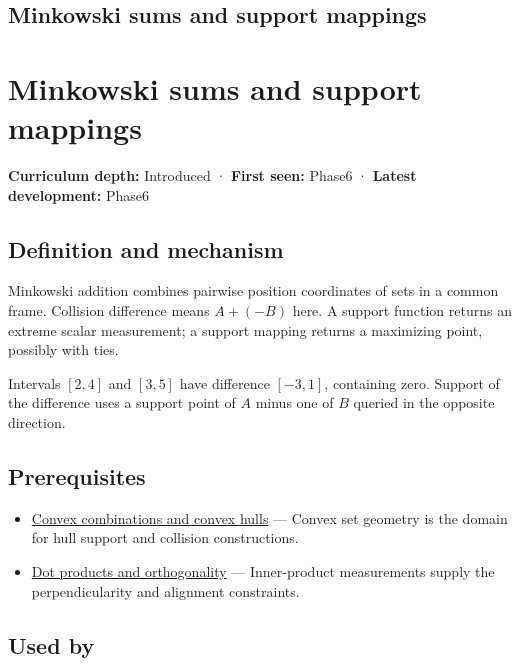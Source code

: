 \hypertarget{appendix-215ac7099a82}{}
\section*{Minkowski sums and support mappings}
\chapter{Minkowski sums and support mappings}\label{appendix-215ac7099a82-minkowski-sums-and-support-mappings}

\textbf{Curriculum depth:} Introduced · \textbf{First seen:} Phase6 · \textbf{Latest development:} Phase6

\section{Definition and mechanism}\label{appendix-215ac7099a82-definition-and-mechanism}

Minkowski addition combines pairwise position coordinates of sets in a common frame. Collision difference means \(A+(-B)\) here. A support function returns an extreme scalar measurement; a support mapping returns a maximizing point, possibly with ties.

Intervals \([2,4]\) and \([3,5]\) have difference \([-3,1]\), containing zero. Support of the difference uses a support point of \(A\) minus one of \(B\) queried in the opposite direction.

\section{Prerequisites}\label{appendix-215ac7099a82-prerequisites}

\begin{itemize}
\tightlist
\item
  \hyperref[appendix-0026ec42c9d5]{Convex combinations and convex hulls} --- Convex set geometry is the domain for hull support and collision constructions.
\item
  \hyperref[appendix-8bc4e8fc547c]{Dot products and orthogonality} --- Inner-product measurements supply the perpendicularity and alignment constraints.
\end{itemize}

\section{Used by}\label{appendix-215ac7099a82-used-by}

